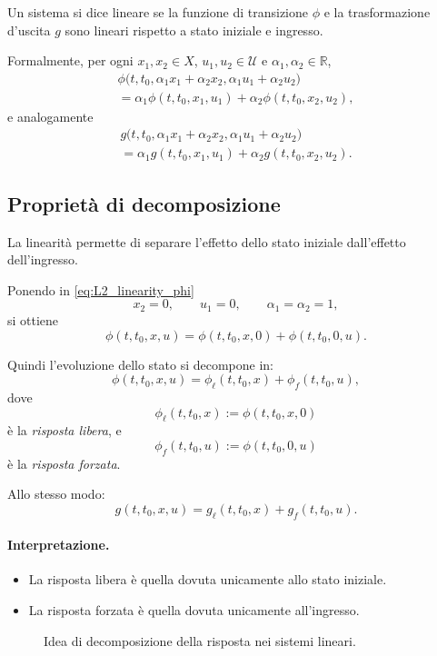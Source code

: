 Un sistema si dice lineare se la funzione di transizione $\phi$ e la trasformazione d'uscita $g$ sono lineari rispetto a stato iniziale e ingresso.

Formalmente, per ogni $x_1,x_2\in X$, $u_1,u_2\in\mathcal{U}$ e $\alpha_1,\alpha_2\in\mathbb{R}$,
\begin{multline}
\phi\bigl(t,t_0,\alpha_1x_1+\alpha_2x_2,\alpha_1u_1+\alpha_2u_2\bigr)
\\
=
\alpha_1\phi(t,t_0,x_1,u_1)+\alpha_2\phi(t,t_0,x_2,u_2),
\label{eq:L2_linearity_phi}
\end{multline}
e analogamente
\begin{multline}
g\bigl(t,t_0,\alpha_1x_1+\alpha_2x_2,\alpha_1u_1+\alpha_2u_2\bigr)
\\
=
\alpha_1g(t,t_0,x_1,u_1)+\alpha_2g(t,t_0,x_2,u_2).
\label{eq:L2_linearity_g}
\end{multline}

\subsection{Proprietà di decomposizione}

La linearità permette di separare l'effetto dello stato iniziale dall'effetto dell'ingresso.

Ponendo in \eqref{eq:L2_linearity_phi}
\[
x_2=0,\qquad u_1=0,\qquad \alpha_1=\alpha_2=1,
\]
si ottiene
\[
\phi(t,t_0,x,u)=\phi(t,t_0,x,0)+\phi(t,t_0,0,u).
\]

Quindi l'evoluzione dello stato si decompone in:
\[
\phi(t,t_0,x,u)=\phi_\ell(t,t_0,x)+\phi_f(t,t_0,u),
\]
dove
\[
\phi_\ell(t,t_0,x):=\phi(t,t_0,x,0)
\]
è la \emph{risposta libera}, e
\[
\phi_f(t,t_0,u):=\phi(t,t_0,0,u)
\]
è la \emph{risposta forzata}.

Allo stesso modo:
\[
g(t,t_0,x,u)=g_\ell(t,t_0,x)+g_f(t,t_0,u).
\]

\paragraph{Interpretazione.}
\begin{itemize}
    \item La risposta libera è quella dovuta unicamente allo stato iniziale.
    \item La risposta forzata è quella dovuta unicamente all'ingresso.
\end{itemize}

\begin{figure}[H]
\centering
{}
\caption{Idea di decomposizione della risposta nei sistemi lineari.}
\end{figure}

